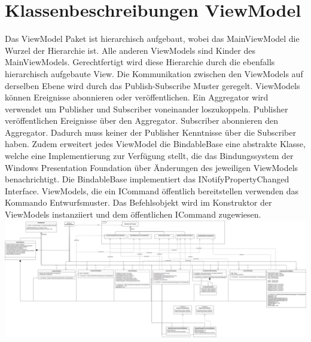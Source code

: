 \documentclass[13pt]{scrreprt}
\begin{document}
	\chapter{Klassenbeschreibungen ViewModel}
	Das ViewModel Paket ist hierarchisch aufgebaut, wobei das MainViewModel die Wurzel der Hierarchie ist. Alle anderen ViewModels sind Kinder des MainViewModels. Gerechtfertigt wird diese Hierarchie durch die ebenfalls hierarchisch aufgebaute View. 
	\newline
	Die Kommunikation zwischen den ViewModels auf derselben Ebene wird durch das Publish-Subscribe Muster geregelt. ViewModels k\"onnen Ereignisse abonnieren oder ver\"offentlichen. Ein Aggregator wird verwendet um Publisher und Subscriber voneinander loszukoppeln. Publisher ver\"offentlichen Ereignisse \"uber den Aggregator. Subscriber abonnieren den Aggregator. Dadurch muss keiner der Publisher Kenntnisse \"uber die Subscriber haben. 
	\newline
	Zudem erweitert jedes ViewModel die BindableBase eine abstrakte Klasse, welche eine Implementierung zur Verf\"ugung stellt, die das Bindungssystem der Windows Presentation Foundation \"uber \"Anderungen des jeweiligen ViewModels benachrichtigt. Die BindableBase implementiert das INotifyPropertyChanged Interface.
	\newline
	ViewModels, die ein ICommand \"offentlich bereitstellen verwenden das Kommando Entwurfsmuster. Das Befehlsobjekt wird im Konstruktor der ViewModels instanziiert und dem \"offentlichen ICommand zugewiesen.
	\newpage
	\includegraphics[angle=90, scale=0.2, center]{ViewModel.png}
\end{document}
